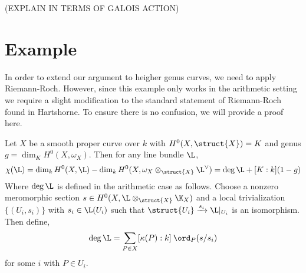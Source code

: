 (EXPLAIN IN TERMS OF GALOIS ACTION)


\section{Example}


In order to extend our argument to heigher genus curves, we need to apply Riemann-Roch. However, since this example only works in the arithmetic setting we require a slight modification to the standard statement of Riemann-Roch found in Hartshorne. To ensure there is no confusion, we will provide a proof here.

\begin{theorem}
Let $X$ be a smooth proper curve over $k$ with $H^0(X, \struct{X}) = K$ and genus $g = \dim_K H^0(X, \omega_X)$. Then for any line bundle $\L$,
\[ \chi(\L) = \dim_k H^0(X, \L) - \dim_k H^0(X, \omega_X \otimes_{\struct{X}} \L^\vee) = \deg{\L} + [ K : k ] (1 - g) \]
Where $\deg{\L}$ is defined in the arithmetic case as follows. Choose a nonzero meromorphic section $s \in H^0(X, \L \otimes_{\struct{X}} \K_X)$ and a local trivialization $\{ (U_i, s_i) \}$ with $s_i \in \L(U_i)$ such that $\struct{U_i} \xrightarrow{s_i} \L|_{U_i}$ is an isomorphism. Then define,
\[ \deg{\L} = \sum_{P \in X} [\kappa(P) : k] \: \ord_{P}(s/s_i) \] 
for some $i$ with $P \in U_i$. 
\end{theorem}

